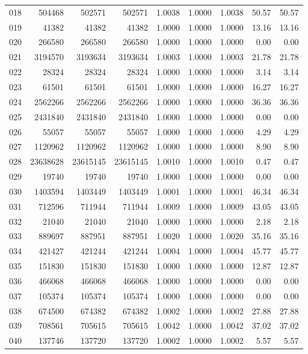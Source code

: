 \begin{longtable}{crrrrrrrr}
018 & 504468 & 502571 & 502571 & 1.0038 & 1.0000 & 1.0038 & 50.57 & 50.57 \\
019 & 41382 & 41382 & 41382 & 1.0000 & 1.0000 & 1.0000 & 13.16 & 13.16 \\
020 & 266580 & 266580 & 266580 & 1.0000 & 1.0000 & 1.0000 & 0.00 & 0.00 \\
021 & 3194570 & 3193634 & 3193634 & 1.0003 & 1.0000 & 1.0003 & 21.78 & 21.78 \\
022 & 28324 & 28324 & 28324 & 1.0000 & 1.0000 & 1.0000 & 3.14 & 3.14 \\
023 & 61501 & 61501 & 61501 & 1.0000 & 1.0000 & 1.0000 & 16.27 & 16.27 \\
024 & 2562266 & 2562266 & 2562266 & 1.0000 & 1.0000 & 1.0000 & 36.36 & 36.36 \\
025 & 2431840 & 2431840 & 2431840 & 1.0000 & 1.0000 & 1.0000 & 0.00 & 0.00 \\
026 & 55057 & 55057 & 55057 & 1.0000 & 1.0000 & 1.0000 & 4.29 & 4.29 \\
027 & 1120962 & 1120962 & 1120962 & 1.0000 & 1.0000 & 1.0000 & 8.90 & 8.90 \\
028 & 23638628 & 23615145 & 23615145 & 1.0010 & 1.0000 & 1.0010 & 0.47 & 0.47 \\
029 & 19740 & 19740 & 19740 & 1.0000 & 1.0000 & 1.0000 & 0.00 & 0.00 \\
030 & 1403594 & 1403449 & 1403449 & 1.0001 & 1.0000 & 1.0001 & 46.34 & 46.34 \\
031 & 712596 & 711944 & 711944 & 1.0009 & 1.0000 & 1.0009 & 43.05 & 43.05 \\
032 & 21040 & 21040 & 21040 & 1.0000 & 1.0000 & 1.0000 & 2.18 & 2.18 \\
033 & 889697 & 887951 & 887951 & 1.0020 & 1.0000 & 1.0020 & 35.16 & 35.16 \\
034 & 421427 & 421244 & 421244 & 1.0004 & 1.0000 & 1.0004 & 45.77 & 45.77 \\
035 & 151830 & 151830 & 151830 & 1.0000 & 1.0000 & 1.0000 & 12.87 & 12.87 \\
036 & 466068 & 466068 & 466068 & 1.0000 & 1.0000 & 1.0000 & 0.00 & 0.00 \\
037 & 105374 & 105374 & 105374 & 1.0000 & 1.0000 & 1.0000 & 0.00 & 0.00 \\
038 & 674500 & 674382 & 674382 & 1.0002 & 1.0000 & 1.0002 & 27.88 & 27.88 \\
039 & 708561 & 705615 & 705615 & 1.0042 & 1.0000 & 1.0042 & 37.02 & 37.02 \\
040 & 137746 & 137720 & 137720 & 1.0002 & 1.0000 & 1.0002 & 5.57 & 5.57 \\

\end{longtable}
